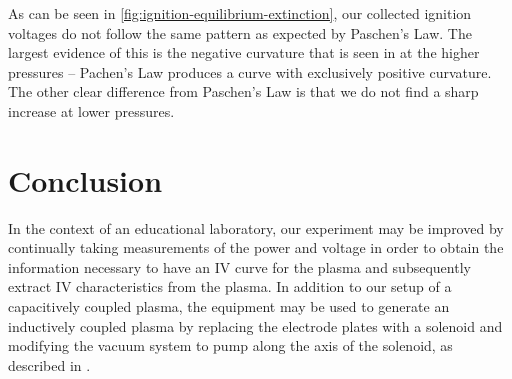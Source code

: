 \documentclass[reprint]{revtex4-1}
\begin{document}
As can be seen in \cref{fig:ignition-equilibrium-extinction}, our collected ignition voltages do not follow the same pattern as expected by Paschen's Law. The largest evidence of this is the negative curvature that is seen in at the higher pressures -- Pachen's Law produces a curve with exclusively positive curvature. The other clear difference from Paschen's Law is that we do not find a sharp increase at lower pressures.

\section{Conclusion}

In the context of an educational laboratory, our experiment may be improved by continually taking measurements of the power and voltage in order to obtain the information necessary to have an IV curve for the plasma and subsequently extract IV characteristics from the plasma. In addition to our setup of a capacitively coupled plasma,  the equipment may be used to generate an inductively coupled plasma by replacing the electrode plates with a solenoid and modifying the vacuum system to pump along the axis of the solenoid, as described in \cite{physics-radio-frequency,Jiayin2010}.


\end{document}
